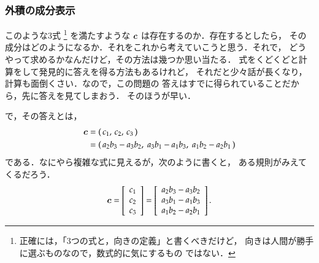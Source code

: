                 \subsubsection{外積の成分表示}
                このような3式
                    \footnote{
                        正確には，「3つの式と，向きの定義」と書くべきだけど，
                        向きは人間が勝手に選ぶものなので，数式的に気にするもの
                        ではない．
                    }
                を満たすような $\boldsymbol{c}$ は存在するのか．存在するとしたら，
                その成分はどのようになるか．それをこれから考えていこうと思う．それで，
                どうやって求めるかなんだけど，その方法は幾つか思い当たる．
                式をくどくどと計算をして発見的に答えを得る方法もあるけれど，
                それだと少々話が長くなり，計算も面倒くさい．なので，この問題の
                答えはすでに得られていることだから，先に答えを見てしまおう．
                そのほうが早い．

                で，その答えとは，
                    \begin{align*}
                        \boldsymbol{c} &= (\,c_{1},\,c_{2},\,c_{3}\,) \\
                            &= (\,
                                    a_{2}b_{3} - a_{3}b_{2},\;
                                    a_{3}b_{1} - a_{1}b_{3},\;
                                    a_{1}b_{2} - a_{2}b_{1}
                                \,)
                    \end{align*}
                である．なにやら複雑な式に見えるが，次のように書くと，
                ある規則がみえてくるだろう．
                    \begin{align}\label{eq:VecGaiseki_Seibun}
                        \bc =
                        \left[
                            \begin{array}{c}
                                c_{1} \\
                                c_{2} \\
                                c_{3} \\
                            \end{array}
                        \right]
                        =
                        \left[
                            \begin{array}{c}
                                a_{2}b_{3} - a_{3}b_{2} \\
                                a_{3}b_{1} - a_{1}b_{3} \\
                                a_{1}b_{2} - a_{2}b_{1} \\
                            \end{array}
                        \right].
                    \end{align}

